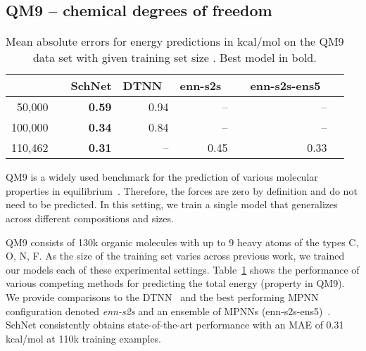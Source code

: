 \documentclass{article}
\begin{document}
\subsection{QM9 -- chemical degrees of freedom}
\begin{table}
\caption{Mean absolute errors for energy predictions in kcal/mol on the QM9 data set with given training set size . Best model in bold.}\label{tab:qm9}
\centering
\small
\begin{tabular}{rrrrrrrr}
\toprule
 & & SchNet & DTNN~\citep{schutt2017quantum} & enn-s2s~\citep{gilmer2017neural} & & enn-s2s-ens5~\citep{gilmer2017neural}\\ \midrule
50,000  && \textbf{0.59} & 0.94 & --   & &  -- \\
100,000 && \textbf{0.34} & 0.84 & --   & &  -- \\
110,462 && \textbf{0.31} & --   & 0.45 & &  0.33 \\
\bottomrule
\end{tabular}
\end{table}
QM9 is a widely used benchmark for the prediction of various molecular properties in equilibrium~\citep{ramakrishnan2014quantum,blum2009gdb13,reymond2015chemical}.
Therefore, the forces are zero by definition and do not need to be predicted.
In this setting, we train a single model that generalizes across different compositions and sizes.

QM9 consists of 130k organic molecules with up to 9 heavy atoms of the types C, O, N, F. 
As the size of the training set varies across previous work, we trained our models each of these experimental settings.
Table~\ref{tab:qm9} shows the performance of various competing methods for predicting the total energy (property  in QM9).
We provide comparisons to the DTNN~\citep{schutt2017quantum} and the best performing MPNN configuration denoted \emph{enn-s2s} and an ensemble of MPNNs (enn-s2s-ens5)~\citep{gilmer2017neural}.
SchNet consistently obtains state-of-the-art performance with an MAE of 0.31 kcal/mol at 110k training examples.
\end{document}
